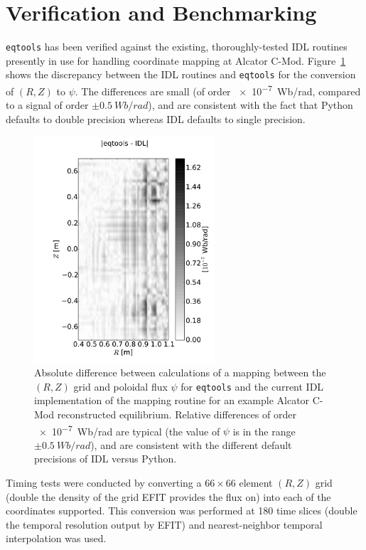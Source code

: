 \documentclass[12pt,floatfix,showpacs]{revtex4-1}
\newcommand{\eqtools}{\texttt{eqtools}\xspace}
\begin{document}
\section{Verification and Benchmarking}\label{sec:benchmark}
\eqtools has been verified against the existing, thoroughly-tested IDL routines presently in use for handling coordinate mapping at Alcator C-Mod.
Figure~\ref{fig:rz2psi_diff} shows the discrepancy between the IDL routines and \eqtools for the conversion of $(R, Z)$ to $\psi$.
The differences are small (of order \SI{e-7}{Wb/rad}, compared to a signal of order $\pm\SI{0.5}{Wb/rad}$), and are consistent with the fact that Python defaults to double precision whereas IDL defaults to single precision.
\begin{figure}
	\includegraphics[width=0.6\textwidth]{graphics/absolute_compare}
	\caption{Absolute difference between calculations of a mapping between the $(R, Z)$ grid and poloidal flux $\psi$ for \eqtools and the current IDL implementation of the mapping routine for an example Alcator C-Mod reconstructed equilibrium.  Relative differences of order \SI{e-7}{Wb/rad} are typical (the value of $\psi$ is in the range $\pm\SI{0.5}{Wb/rad}$), and are consistent with the different default precisions of IDL versus Python.}
	\label{fig:rz2psi_diff}
\end{figure}
Timing tests were conducted by converting a $66\times66$ element $(R, Z)$ grid (double the density of the grid EFIT provides the flux on) into each of the coordinates supported.
This conversion was performed at 180 time slices (double the temporal resolution output by EFIT) and nearest-neighbor temporal interpolation was used.
\end{document}
